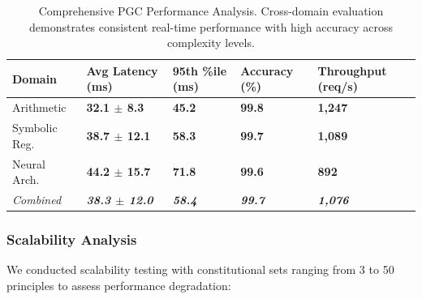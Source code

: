 \documentclass[manuscript,screen,review,anonymous,9pt]{acmart}
\newcommand{\tablesize}{\tiny}
\newcommand{\tablenumfmt}[1]{\textbf{#1}}
\newcommand{\tableheader}[1]{\textbf{#1}}
\begin{document}
\begin{table}[htbp]
	\centering
	\caption{Comprehensive PGC Performance Analysis. Cross-domain evaluation demonstrates consistent real-time performance with high accuracy across complexity levels.}
	\label{tab:pgc_comprehensive}
	\tablesize
	\begin{tabular}{@{}l>{\centering\arraybackslash}p{1.4cm}>{\centering\arraybackslash}p{1.4cm}>{\centering\arraybackslash}p{1.2cm}>{\centering\arraybackslash}p{1.4cm}@{}}
		\toprule
		\tableheader{Domain} & \tableheader{Avg Latency (ms)}         & \tableheader{95th \%ile (ms)} & \tableheader{Accuracy (\%)} & \tableheader{Throughput (req/s)} \\
		\midrule
		Arithmetic           & \tablenumfmt{32.1 $ \pm $ 8.3}           & \tablenumfmt{45.2}            & \tablenumfmt{99.8}          & \tablenumfmt{1,247}              \\
		Symbolic Reg.        & \tablenumfmt{38.7 $ \pm $ 12.1}          & \tablenumfmt{58.3}            & \tablenumfmt{99.7}          & \tablenumfmt{1,089}              \\
		Neural Arch.         & \tablenumfmt{44.2 $ \pm $ 15.7}          & \tablenumfmt{71.8}            & \tablenumfmt{99.6}          & \tablenumfmt{892}                \\
		\midrule
		\textit{Combined}    & \textit{\tablenumfmt{38.3 $ \pm $ 12.0}} & \textit{\tablenumfmt{58.4}}   & \textit{\tablenumfmt{99.7}} & \textit{\tablenumfmt{1,076}}     \\
		\bottomrule
	\end{tabular}
\end{table}

\subsubsection{Scalability Analysis}
We conducted scalability testing with constitutional sets ranging from 3 to 50 principles to assess performance degradation:
\end{document}
